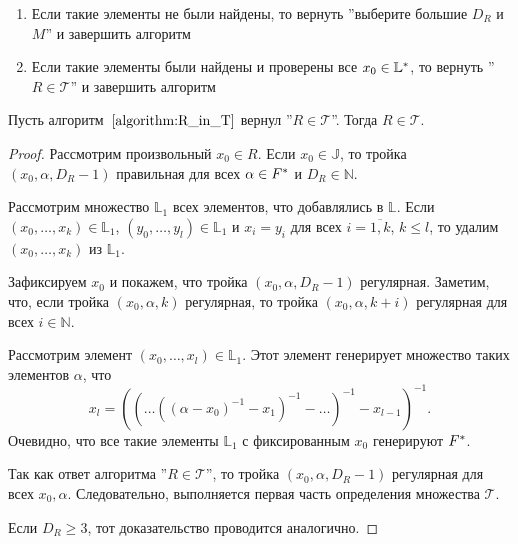 \documentclass[_00_dissertation.tex]{subfiles}
\begin{document}
\begin{algorithm}
\begin{enumerate}
\begin{enumerate}
            \item Если такие элементы не были найдены, то вернуть ''выберите большие $D_R$ и $M$'' и завершить алгоритм
            
            \item Если такие элементы были найдены и проверены все $x_0 \in \mathbb{L}^{*}$, то вернуть ''$R \in \mathcal{T}$'' и завершить алгоритм
        \end{enumerate}
    \end{enumerate}
\end{algorithm}

\begin{proposition}
    Пусть алгоритм~$\ref{algorithm:R_in_T}$ вернул ''$R \in \mathcal{T}$''.
    Тогда $R \in \mathcal{T}$.
\end{proposition}
\begin{proof}
    Рассмотрим произвольный $x_0 \in R$.
    Если $x_0 \in \mathbb{J}$, то тройка $(x_0, \alpha, D_R - 1)$ правильная для всех $\alpha \in F^{*}$ и $D_R \in \mathbb{N}$.

    Рассмотрим множество $\mathbb{L}_1$ всех элементов, что добавлялись в $\mathbb{L}$.
    Если $(x_0, \ldots, x_k) \in \mathbb{L}_1$, $(y_0, \ldots, y_l) \in \mathbb{L}_1$ и $x_i = y_i$ для всех $i = \overline{1,k}$, $k \le l$, то удалим $(x_0, \ldots, x_k)$ из $\mathbb{L}_1$.

    Зафиксируем $x_0$ и покажем, что тройка $(x_0, \alpha, D_R - 1)$ регулярная.
    Заметим, что, если тройка $(x_0, \alpha, k)$ регулярная, то тройка $(x_0, \alpha, k + i)$ регулярная для всех $i \in \mathbb{N}$.

    Рассмотрим элемент $(x_0, \ldots, x_l) \in \mathbb{L}_1$.
    Этот элемент генерирует множество таких элементов $\alpha$, что
    \begin{equation*}
        x_l = \left(
            \left(
                \ldots \left(
                    \left(
                        \alpha - x_0
                    \right)^{-1} - x_1
                \right)^{-1} - \ldots
            \right)^{-1} - x_{l-1}
        \right)^{-1}.
    \end{equation*}
    Очевидно, что все такие элементы $\mathbb{L}_1$ с фиксированным $x_0$ генерируют $F^{*}$.
    
    Так как ответ алгоритма ''$R \in \mathcal{T}$'', то тройка $(x_0, \alpha, D_R - 1)$ регулярная для всех $x_0, \alpha$.
    Следовательно, выполняется первая часть определения множества $\mathcal{T}$.
    
    Если $D_R \ge 3$, тот доказательство проводится аналогично.
\end{proof}
\end{document}
